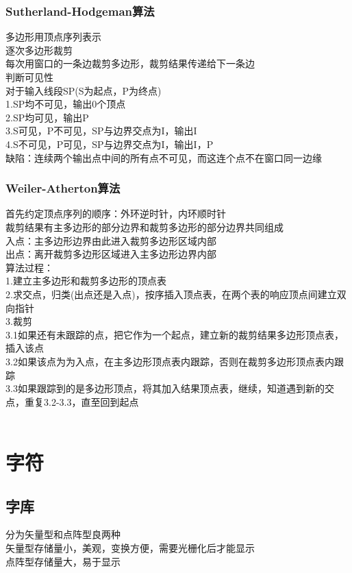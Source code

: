 \documentclass{article}
\begin{document}
\begin{CJK}{UTF8}{gbsn}
	\subsubsection{Sutherland-Hodgeman算法}
	多边形用顶点序列表示\\
	逐次多边形裁剪\\
	每次用窗口的一条边裁剪多边形，裁剪结果传递给下一条边\\
	判断可见性\\
	对于输入线段SP(S为起点，P为终点)\\
	1.SP均不可见，输出0个顶点\\
	2.SP均可见，输出P\\
	3.S可见，P不可见，SP与边界交点为I，输出I\\
	4.S不可见，P可见，SP与边界交点为I，输出I，P\\
	缺陷：连续两个输出点中间的所有点不可见，而这连个点不在窗口同一边缘\\	
	\subsubsection{Weiler-Atherton算法}
	首先约定顶点序列的顺序：外环逆时针，内环顺时针\\
	裁剪结果有主多边形的部分边界和裁剪多边形的部分边界共同组成\\
	入点：主多边形边界由此进入裁剪多边形区域内部\\
	出点：离开裁剪多边形区域进入主多边形边界内部\\
	算法过程：\\
	1.建立主多边形和裁剪多边形的顶点表\\
	2.求交点，归类(出点还是入点)，按序插入顶点表，在两个表的响应顶点间建立双向指针\\
	3.裁剪\\
	3.1如果还有未跟踪的点，把它作为一个起点，建立新的裁剪结果多边形顶点表，插入该点\\
	3.2如果该点为为入点，在主多边形顶点表内跟踪，否则在裁剪多边形顶点表内跟踪\\
	3.3如果跟踪到的是多边形顶点，将其加入结果顶点表，继续，知道遇到新的交点，重复3.2-3.3，直至回到起点\\
	\\
	\section{字符}
	\subsection{字库}
	分为矢量型和点阵型良两种\\
	矢量型存储量小，美观，变换方便，需要光栅化后才能显示\\
	点阵型存储量大，易于显示\\

\end{CJK}
\end{document}
